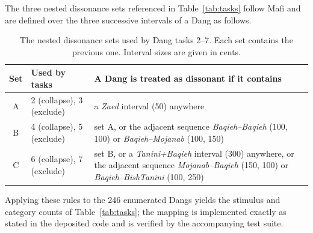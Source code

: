 \documentclass[pdflatex,sn-nature]{sn-jnl}
\begin{document}
\begin{appendices}
The three nested dissonance sets referenced in Table~\ref{tab:tasks} follow Mafi \cite{mafi2009} and are defined over the three successive intervals of a Dang as follows.

\begin{table}[htbp]
\centering
\caption{The nested dissonance sets used by Dang tasks 2--7. Each set contains the
previous one. Interval sizes are given in cents.}
\label{tab:dissonance}
\small
\begin{tabular}{@{}clp{}@{}}
\toprule
Set & Used by tasks & A Dang is treated as dissonant if it contains \\
\midrule
A & 2 (collapse), 3 (exclude) & a \emph{Zaed} interval (50) anywhere \\
B & 4 (collapse), 5 (exclude) & set A, or the adjacent sequence \emph{Baqieh--Baqieh}
(100, 100) or \emph{Baqieh--Mojanab} (100, 150) \\
C & 6 (collapse), 7 (exclude) & set B, or a \emph{Tanini+Baqieh} interval (300) anywhere,
or the adjacent sequence \emph{Mojanab--Baqieh} (150, 100) or \emph{Baqieh--BishTanini}
(100, 250) \\
\bottomrule
\end{tabular}
\end{table}

Applying these rules to the 246 enumerated Dangs yields the stimulus and category counts of
Table~\ref{tab:tasks}; the mapping is implemented exactly as stated in the deposited code
and is verified by the accompanying test suite.

\end{appendices}


\end{document}
